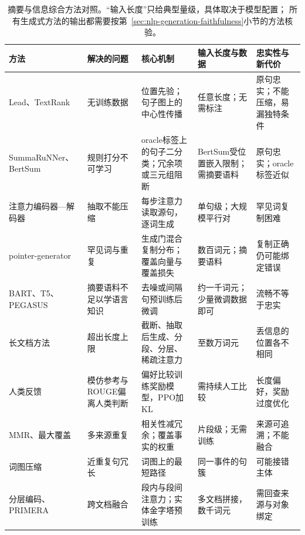 \begin{table}[htbp]
  \centering
  \small
  \begin{tabularx}{\linewidth}{@{}>{\raggedright\arraybackslash}p{26mm}
    >{\raggedright\arraybackslash}p{28mm}>{\raggedright\arraybackslash}p{38mm}
    >{\raggedright\arraybackslash}p{26mm}>{\raggedright\arraybackslash}X@{}}
    \toprule
    方法 & 解决的问题 & 核心机制 & 输入长度与数据 & 忠实性与新代价\\
    \midrule
    Lead、TextRank & 无训练数据 & 位置先验；句子图上的中心性传播 & 任意长度；无需标注 & 原句忠实；不能压缩，易漏独特条件\\
    SummaRuNNer、BertSum & 规则打分不可学习 & oracle标签上的句子二分类；冗余项或三元组阻断 & BertSum受位置嵌入限制；需摘要语料 & 原句忠实；oracle标签近似\\
    注意力编码器—解码器 & 抽取不能压缩 & 每步注意力读取源句，逐词生成 & 单句级；大规模平行对 & 罕见词复制困难\\
    pointer-generator & 罕见词与重复 & 生成门混合复制分布；覆盖向量与覆盖损失 & 数百词元；摘要语料 & 复制正确仍可能绑定错误\\
    BART、T5、PEGASUS & 摘要语料不足以学语言知识 & 去噪或间隔句预训练后微调 & 约一千词元；少量微调数据即可 & 流畅不等于忠实\\
    长文档方法 & 超出长度上限 & 截断、抽取后生成、分段、分层、稀疏注意力 & 至数万词元 & 丢信息的位置各不相同\\
    人类反馈 & 模仿参考与ROUGE偏离人类判断 & 偏好比较训练奖励模型，PPO加KL & 需持续人工比较 & 长度偏好，奖励过度优化\\
    MMR、最大覆盖 & 多来源重复 & 相关性减冗余；覆盖事实的权重 & 片段级；无需训练 & 来源可追溯；不能融合\\
    词图压缩 & 近重复句冗长 & 词图上的最短路径 & 同一事件的句簇 & 可能接错主体\\
    分层编码、PRIMERA & 跨文档融合 & 段内与段间注意力；实体金字塔预训练 & 多文档拼接，数千词元 & 需回查来源与对象绑定\\
    \bottomrule
  \end{tabularx}
  \caption{摘要与信息综合方法对照。“输入长度”只给典型量级，具体取决于模型配置；
  所有生成式方法的输出都需要按第~\ref{sec:nlp-generation-faithfulness}小节的方法核验。}
  \label{tab:nlp-generation-summarization-methods}
\end{table}
\FloatBarrier
